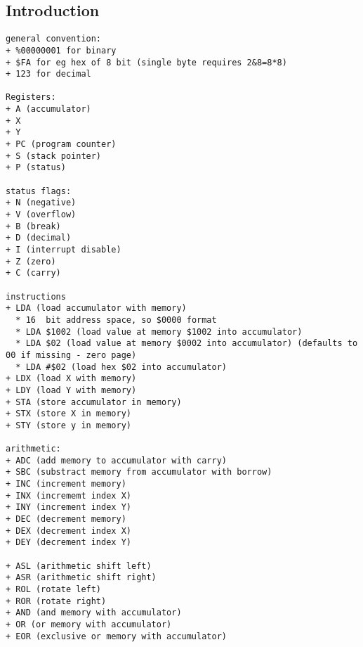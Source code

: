 
\subsection{Introduction}

\begin{verbatim}
general convention:
+ %00000001 for binary
+ $FA for eg hex of 8 bit (single byte requires 2&8=8*8)
+ 123 for decimal

Registers:
+ A (accumulator)
+ X
+ Y
+ PC (program counter)
+ S (stack pointer)
+ P (status)

status flags:
+ N (negative)
+ V (overflow)
+ B (break)
+ D (decimal)
+ I (interrupt disable)
+ Z (zero)
+ C (carry)

instructions
+ LDA (load accumulator with memory)
  * 16  bit address space, so $0000 format
  * LDA $1002 (load value at memory $1002 into accumulator)
  * LDA $02 (load value at memory $0002 into accumulator) (defaults to 00 if missing - zero page)
  * LDA #$02 (load hex $02 into accumulator)
+ LDX (load X with memory)
+ LDY (load Y with memory)
+ STA (store accumulator in memory)
+ STX (store X in memory)
+ STY (store y in memory)

arithmetic:
+ ADC (add memory to accumulator with carry)
+ SBC (substract memory from accumulator with borrow)
+ INC (increment memory)
+ INX (incrememt index X)
+ INY (increment index Y)
+ DEC (decrement memory)
+ DEX (decrement index X)
+ DEY (decrement index Y)

+ ASL (arithmetic shift left)
+ ASR (arithmetic shift right)
+ ROL (rotate left)
+ ROR (rotate right)
+ AND (and memory with accumulator)
+ OR (or memory with accumulator)
+ EOR (exclusive or memory with accumulator)

\end{verbatim}

